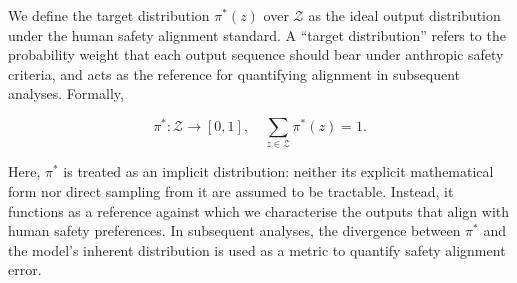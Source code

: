 
\begin{definition}\label{def:2-3-ground-truth-safety-distribution}

We define the target distribution $\pi^\ast(z)$ over $\mathcal{Z}$ as the ideal output distribution under the human safety alignment standard.  
A ``target distribution'' refers to the probability weight that each output sequence should bear under anthropic safety criteria, and acts as the reference for quantifying alignment in subsequent analyses. 
Formally,

\[
\pi^\ast:\mathcal{Z}\to[0,1],\quad \sum_{z\in\mathcal{Z}}\pi^\ast(z)=1.
\]

Here, $\pi^\ast$ is treated as an implicit distribution: neither its explicit mathematical form nor direct sampling from it are assumed to be tractable. Instead, it functions as a reference against which we characterise the outputs that align with human safety preferences. In subsequent analyses, the divergence between $\pi^\ast$ and the model's inherent distribution is used as a metric to quantify safety alignment error.


\end{definition}

